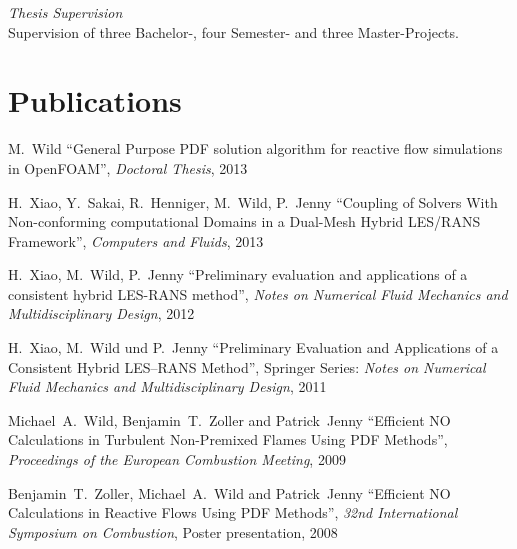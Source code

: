 \documentclass[line,11pt,a4paper]{../resume}
\begin{document}
\begin{resume}
\textsl{Thesis Supervision}\\
Supervision of three Bachelor-, four Semester- and three Master-Projects.

\section{\mysidestyle Publications}\vspace{2mm}
M.~Wild
``General Purpose PDF solution algorithm for reactive flow simulations in
OpenFOAM'', \textsl{Doctoral Thesis}, 2013

\vspace{-2mm}
H.~Xiao, Y.~Sakai, R.~Henniger, M.~Wild, P.~Jenny
``Coupling of Solvers With Non-conforming computational Domains in a Dual-Mesh
Hybrid LES/RANS Framework'', \textsl{Computers and Fluids}, 2013

\vspace{-2mm}
H.~Xiao, M.~Wild, P.~Jenny
``Preliminary evaluation and applications of a consistent hybrid LES-RANS
method'', \textsl{Notes on Numerical Fluid Mechanics and Multidisciplinary
Design}, 2012

\vspace{-2mm}
H.~Xiao, M.~Wild und P.~Jenny ``Preliminary Evaluation and
Applications of a Consistent Hybrid LES--RANS Method'', Springer Series:
\textsl{Notes on Numerical Fluid Mechanics and Multidisciplinary Design}, 2011

\vspace{-2mm}
Michael~A.~Wild, Benjamin~T.~Zoller and Patrick~Jenny
``Efficient $\mathrm{NO}$ Calculations in Turbulent Non-Premixed Flames Using
PDF Methods'', \textsl{Proceedings of the European Combustion Meeting}, 2009

\vspace{-2mm}
Benjamin~T.~Zoller, Michael~A.~Wild and Patrick~Jenny
``Efficient $\mathrm{NO}$ Calculations in Reactive Flows Using PDF Methods'',
\textsl{32nd International Symposium on Combustion}, Poster presentation, 2008



\end{resume}
\end{document}
